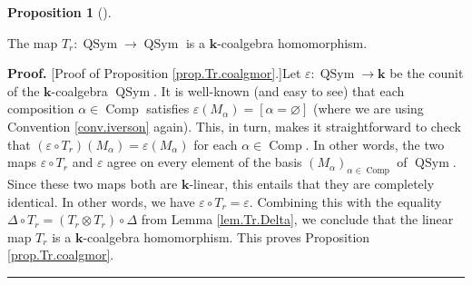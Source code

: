 \documentclass[numbers=enddot,12pt,final,onecolumn,notitlepage]{scrartcl}%
\theoremstyle{definition}
\newtheorem{prop}[theo]{Proposition}
\newenvironment{proposition}[1][]
{\begin{prop}[#1]\begin{leftbar}}
{\end{leftbar}\end{prop}}
\newenvironment{proof}[1][Proof]{\noindent\textbf{#1.} }{\ \rule{0.5em}{0.5em}}
\newenvironment{vershort}{}{}
\begin{document}
\begin{proposition}
\label{prop.Tr.coalgmor}The map $T_{r}:\operatorname*{QSym}\rightarrow
\operatorname*{QSym}$ is a $\mathbf{k}$-coalgebra homomorphism.
\end{proposition}

\begin{vershort}


\begin{proof}
[Proof of Proposition \ref{prop.Tr.coalgmor}.]Let $\varepsilon
:\operatorname*{QSym}\rightarrow\mathbf{k}$ be the counit of the $\mathbf{k}%
$-coalgebra $\operatorname*{QSym}$. It is well-known (and easy to see) that
each composition $\alpha\in\operatorname*{Comp}$ satisfies $\varepsilon\left(
M_{\alpha}\right)  =\left[  \alpha=\varnothing\right]  $ (where we are using
Convention \ref{conv.iverson} again). This, in turn, makes it straightforward
to check that $\left(  \varepsilon\circ T_{r}\right)  \left(  M_{\alpha
}\right)  =\varepsilon\left(  M_{\alpha}\right)  $ for each $\alpha
\in\operatorname*{Comp}$. In other words, the two maps $\varepsilon\circ
T_{r}$ and $\varepsilon$ agree on every element of the basis $\left(
M_{\alpha}\right)  _{\alpha\in\operatorname*{Comp}}$ of $\operatorname*{QSym}%
$. Since these two maps both are $\mathbf{k}$-linear, this entails that they
are completely identical. In other words, we have $\varepsilon\circ
T_{r}=\varepsilon$. Combining this with the equality $\Delta\circ
T_{r}=\left(  T_{r}\otimes T_{r}\right)  \circ\Delta$ from Lemma
\ref{lem.Tr.Delta}, we conclude that the linear map $T_{r}$ is a $\mathbf{k}%
$-coalgebra homomorphism. This proves Proposition \ref{prop.Tr.coalgmor}.
\end{proof}
\end{vershort}
\end{document}
